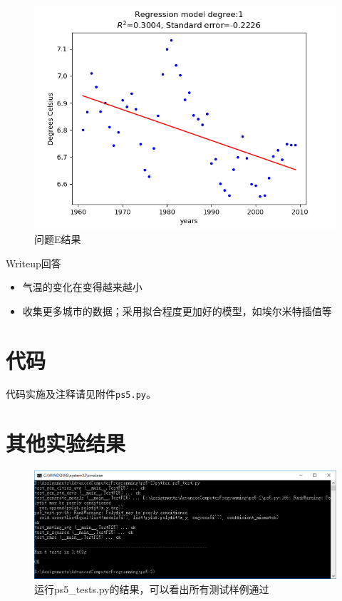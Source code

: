 \documentclass[logo,reportComp]{thesis}
\begin{document}
\begin{figure}[H]
\centering
\includegraphics[width=0.6\linewidth]{fig/E.png}
\caption{问题E结果}
\end{figure}

Writeup回答
\begin{itemize}
	\item 气温的变化在变得越来越小
	\item 收集更多城市的数据；采用拟合程度更加好的模型，如埃尔米特插值等
\end{itemize}

\section{代码}
代码实施及注释请见附件\verb'ps5.py'。

\section{其他实验结果}
\label{sec:exp}
\begin{figure}[H]
\centering
\includegraphics[width=\linewidth]{fig/test.PNG}
\caption{运行ps5\_tests.py的结果，可以看出所有测试样例通过}
\label{fig:test}
\end{figure}
\end{document}
